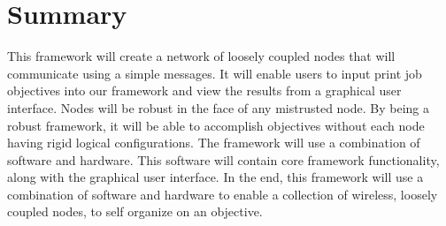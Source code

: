\documentclass[draftclsnofoot, onecolumn, compsoc, 10pt]{IEEEtran}
\begin{document}
\section{Summary}
This framework will create a network of loosely coupled nodes that will communicate using a simple messages. It will enable users to input print job objectives into our framework and view the results from a graphical user interface. Nodes will be robust in the face of any mistrusted node. By being a robust framework, it will be able to accomplish objectives without each node having rigid logical configurations. The framework will use a combination of software and hardware. This software will contain core framework functionality, along with the graphical user interface. In the end, this framework will use a combination of software and hardware to enable a collection of wireless, loosely coupled nodes, to self organize on an objective.
\end{document}

